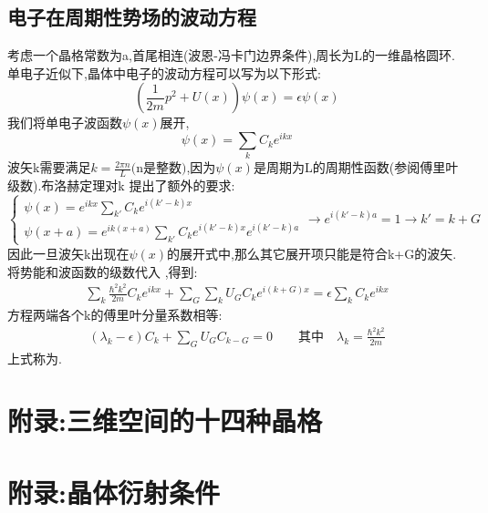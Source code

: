 \subsection{电子在周期性势场的波动方程}
考虑一个晶格常数为a,首尾相连(波恩-冯卡门边界条件),周长为L的一维晶格圆环.单电子近似下,晶体中电子的波动方程可以写为以下形式:
\begin{equation}
    (\frac{1}{2m}p^2+U(x))\psi(x)=\epsilon\psi(x)
    \label{seq_c}
\end{equation}
我们将单电子波函数$\psi(x)$展开,
\begin{equation}
    \psi(x)=\sum_{k}C_{k}e^{ikx}
\end{equation}
波矢k需要满足$k=\frac{2\pi n}{L}\text{(n是整数)}$,因为$\psi(x)$是周期为L的周期性函数(参阅傅里叶级数).布洛赫定理对k
提出了额外的要求:
\[
    \left\{\begin{array}{l}
        \psi(x)=e^{ikx}\sum_{k'}C_ke^{i(k'-k)x}\\
        \psi(x+a)=e^{ik(x+a)}\sum_{k'}C_ke^{i(k'-k)x}e^{i(k'-k)a}
    \end{array}\right .\rightarrow e^{i(k'-k)a}=1\rightarrow k'=k+G
    \]
因此一旦波矢k出现在$\psi(x)$的展开式中,那么其它展开项只能是符合k+G的波矢.将势能和波函数的级数代入
\label{seq_c},得到:
\begin{align}
\sum_{k}\frac{\hbar^2k^2}{2m}C_ke^{ikx}+\sum_{G}\sum_{k}U_GC_ke^{i(k+G)x}=\epsilon\sum_{k}C_ke^{ikx}
\end{align}
方程两端各个k的傅里叶分量系数相等:
\begin{gather}
    (\lambda_k-\epsilon)C_k+\sum_{G}U_GC_{k-G}=0 \quad\quad\text{其中}\quad\lambda_k=\frac{\hbar^2k^2}{2m}
\end{gather}
上式称为.
\section{附录:三维空间的十四种晶格}
\section{附录:晶体衍射条件}